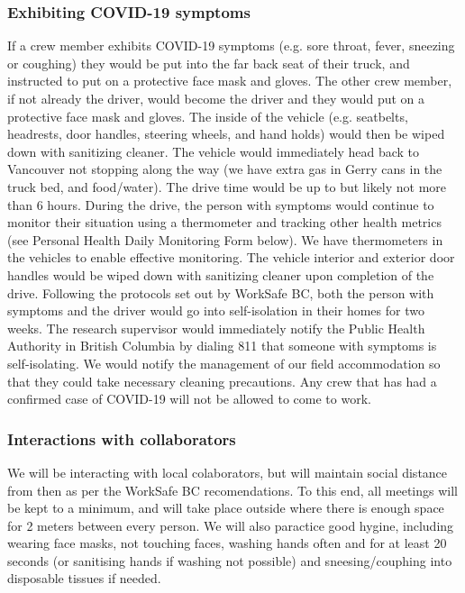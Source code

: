 \documentclass[11pt,letter]{article}
\begin{document}
\subsubsection{Exhibiting COVID-19 symptoms}
If a crew member exhibits COVID-19 symptoms (e.g. sore throat, fever, sneezing or coughing) they would be put into the far back seat of their truck, and instructed to put on a protective face mask and gloves. The other crew member, if not already the driver, would become the driver and they would put on a protective face mask and gloves. The inside of the vehicle (e.g. seatbelts, headrests, door handles, steering wheels, and hand holds) would then be wiped down with sanitizing cleaner. The vehicle would immediately head back to Vancouver not stopping along the way (we have extra gas in Gerry cans in the truck bed, and food/water). The drive time would be up to but likely not more than 6 hours. During the drive, the person with symptoms would continue to monitor their situation using a thermometer and tracking other health metrics (see Personal Health Daily Monitoring Form below). We have thermometers in the vehicles to enable effective monitoring. The vehicle interior and exterior door handles would be wiped down with sanitizing cleaner upon completion of the drive. Following the protocols set out by WorkSafe BC, both the person with symptoms and the driver would go into self-isolation in their homes for two weeks. The research supervisor would immediately notify the Public Health Authority in British Columbia by dialing 811 that someone with symptoms is self-isolating. We would notify the management of our field accommodation so that they could take necessary cleaning precautions.  Any crew that has had a confirmed case of COVID-19 will not be allowed to come to work.

\subsubsection{Interactions with collaborators}
We will be interacting with local colaborators, but will maintain social distance from then as per the WorkSafe BC recomendations. To this end, all meetings will be kept to a minimum, and will take place outside where there is enough space for 2 meters between every person. We will also paractice good hygine, including wearing face masks, not touching faces, washing hands often and for at least 20 seconds (or sanitising hands if washing not possible) and sneesing/couphing into disposable tissues if needed. 
\end{document}
